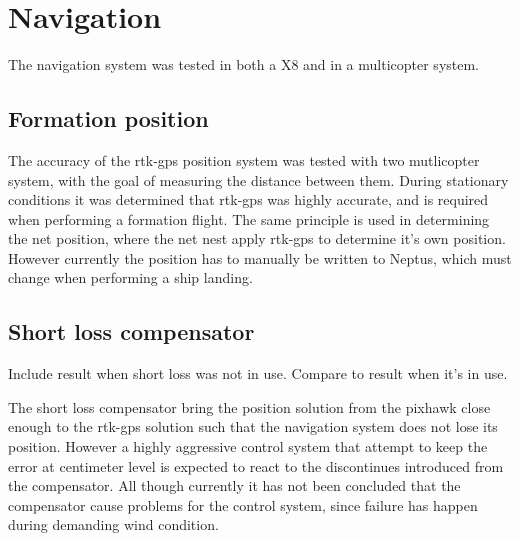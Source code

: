 \section{Navigation}\label{ss:EXNavigation}
The navigation system was tested in both a X8 and in a multicopter system.

\subsection{Formation position}
The accuracy of the \gls{rtk-gps} position system was tested with two mutlicopter system, with the goal of measuring the distance between them. During stationary conditions it was determined that \gls{rtk-gps} was highly accurate, and is required when performing a formation flight. The same principle is used in determining the net position, where the net nest apply \gls{rtk-gps} to determine it's own position. However currently the position has to manually be written to Neptus, which must change when performing a ship landing.
\subsection{Short loss compensator}
Include result when short loss was not in use. Compare to result when it's in use.

The short loss compensator bring the position solution from the pixhawk close enough to the \gls{rtk-gps} solution such that the navigation system does not lose its position. However a highly aggressive control system that attempt to keep the error at centimeter level is expected to react to the discontinues introduced from the compensator. All though currently it has not been concluded that the compensator cause problems for the control system, since failure has happen during demanding wind condition. 